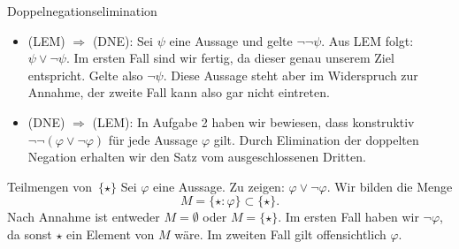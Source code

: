 \documentclass{pizzablatt}
\begin{document}
\pagebreak

\begin{aufgabe}{Doppelnegationselimination}
\begin{itemize}
  \item (LEM) $\Rightarrow$ (DNE): Sei $\psi$ eine Aussage und gelte $\neg\neg\psi$. Aus LEM folgt: $\psi \vee \neg\psi$. Im ersten Fall sind wir fertig, da dieser genau unserem Ziel entspricht. Gelte also $\neg\psi$. Diese Aussage steht aber im Widerspruch zur Annahme, der zweite Fall kann also gar nicht eintreten.
  \item (DNE) $\Rightarrow$ (LEM): In Aufgabe 2 haben wir bewiesen, dass konstruktiv $\neg\neg(\varphi \vee \neg\varphi)$ für jede Aussage $\varphi$ gilt. Durch Elimination der doppelten Negation erhalten wir den Satz vom ausgeschlossenen Dritten.
\end{itemize}

\end{aufgabe}

\begin{aufgabe}{Teilmengen von~$\{\star\}$}
Sei $\varphi$ eine Aussage. Zu zeigen: $\varphi \vee \neg\varphi$. Wir bilden die Menge
\[ M = \{ \star : \varphi \} \subset \{\star\}. \]
Nach Annahme ist entweder $M = \emptyset$ oder $M = \{\star\}$. Im ersten Fall haben wir $\neg\varphi$, da sonst $\star$ ein Element von $M$ wäre. Im zweiten Fall gilt offensichtlich $\varphi$.
\end{aufgabe}
\end{document}
